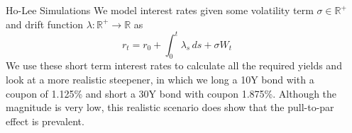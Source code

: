 \documentclass[final]{beamer}
\newlength{\sepwidth}
\newlength{\colwidth}
\newcommand{\separatorcolumn}{\begin{column}{\sepwidth}\end{column}}
\begin{document}
\begin{frame}[t]
\begin{columns}[t]
\begin{column}{\colwidth}
  \begin{block}{Ho-Lee Simulations}
    We model interest rates given some volatility term $\sigma \in \mathbb{R}^{+}$ and drift function $\lambda:\mathbb{R}^{+} \to \mathbb{R}$ as $$r_t = r_0 + \int_0^t\lambda_s\,ds + \sigma W_t$$
    We use these short term interest rates to calculate all the required yields and look at a more realistic steepener, in which we long a 10Y bond with a coupon of 1.125\% and short a 30Y bond with coupon 1.875\%. Although the magnitude is very low, this realistic scenario does show that the pull-to-par effect is prevalent.

  \end{block}



\end{column}

\separatorcolumn
\end{columns}
\end{frame}
\end{document}
